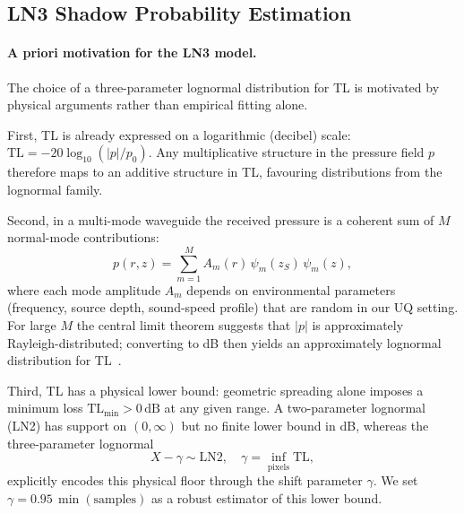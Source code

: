 \documentclass[11pt,a4paper]{article}
\begin{document}
\subsection{LN3 Shadow Probability Estimation}
\label{sec:ln3}

\paragraph{A priori motivation for the LN3 model.}
The choice of a three-parameter lognormal distribution for TL is motivated by
physical arguments rather than empirical fitting alone.

First, TL is already expressed on a logarithmic (decibel) scale:
$\mathrm{TL} = -20\log_{10}(|p|/p_0)$.
Any multiplicative structure in the pressure field $p$ therefore maps to
an additive structure in TL, favouring distributions from the lognormal family.

Second, in a multi-mode waveguide the received pressure is a coherent sum of
$M$ normal-mode contributions:
\begin{equation}
  p(r,z) = \sum_{m=1}^{M} A_m(r)\,\psi_m(z_S)\,\psi_m(z),
\end{equation}
where each mode amplitude $A_m$ depends on environmental parameters
(frequency, source depth, sound-speed profile) that are random in our UQ setting.
For large $M$ the central limit theorem suggests that $|p|$ is approximately
Rayleigh-distributed; converting to dB then yields an approximately lognormal
distribution for TL~\cite{brekhovskikh1991}.

Third, TL has a physical lower bound: geometric spreading alone imposes a
minimum loss $\mathrm{TL}_{\min} > 0\,\mathrm{dB}$ at any given range.
A two-parameter lognormal (LN2) has support on $(0,\infty)$ but no
finite lower bound in dB, whereas the three-parameter lognormal
\begin{equation}
  X - \gamma \sim \mathrm{LN2}, \quad \gamma = \inf_{\text{pixels}} \mathrm{TL},
\end{equation}
explicitly encodes this physical floor through the shift parameter $\gamma$.
We set $\gamma = 0.95\,\min(\text{samples})$ as a robust estimator of
this lower bound.
\end{document}
